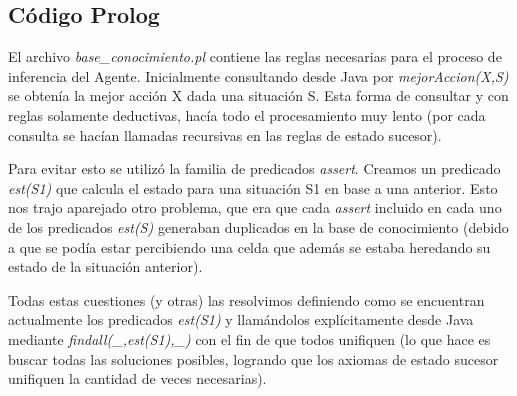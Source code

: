 \subsection{Código Prolog}

El archivo \emph{base\_conocimiento.pl} contiene las reglas necesarias para el
proceso de inferencia del Agente. Inicialmente consultando desde Java por \linebreak
\emph{mejorAccion(X,S)} se obtenía la mejor acción X dada una situación S. Esta
forma de consultar y con reglas solamente deductivas, hacía todo el
procesamiento muy lento (por cada consulta se hacían llamadas recursivas en las
reglas de estado sucesor).

Para evitar esto se utilizó la familia de predicados \emph{assert}.
Creamos un predicado \emph{est(S1)} que calcula el estado para una situación
S1 en base a una anterior. Esto nos trajo aparejado otro problema, que era
que cada \emph{assert} incluido en cada uno de los predicados \emph{est(S)} 
generaban duplicados en la base de conocimiento (debido a que se podía estar
 percibiendo una celda que además se estaba heredando su estado de la situación
 anterior). 

Todas estas cuestiones (y otras) las resolvimos definiendo como se encuentran
 actualmente los predicados \emph{est(S1)} y llamándolos explícitamente desde
 Java mediante \emph{findall(\_,est(S1),\_)} con el fin de que todos unifiquen (lo que hace es buscar todas las soluciones posibles, logrando que los axiomas de estado sucesor unifiquen la cantidad de veces necesarias).
